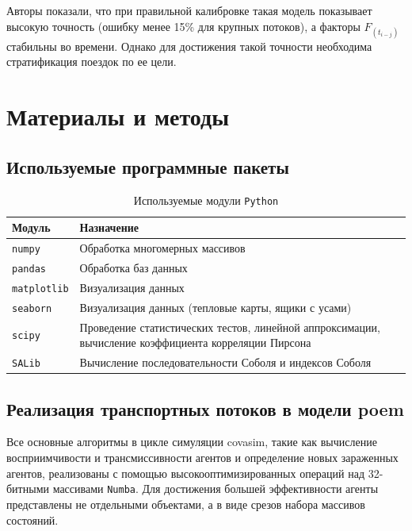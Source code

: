 \documentclass[a4paper,12pt]{article} %
\begin{document}
Авторы показали, что при правильной калибровке такая модель показывает высокую точность (ошибку менее 15\% для крупных потоков), а факторы $F_{(t_{i-j})}$ стабильны во времени. Однако для достижения такой точности необходима стратификация поездок по ее цели.



\section{Материалы и методы}
\subsection{Используемые программные пакеты}
\begin{table}[h!]
\centering
\begin{tabular}{p{4cm} p{10cm}}
\toprule
\textbf{Модуль} & \textbf{Назначение} \\
\midrule
\texttt{numpy} \cite{harris2020array} & Обработка многомерных массивов \\
\texttt{pandas} \cite{reback2020pandas} & Обработка баз данных \\
\texttt{matplotlib} \cite{Hunter:2007} & Визуализация данных \\
\texttt{seaborn} \cite{michael_waskom_2017_883859} & Визуализация данных (тепловые карты, ящики с усами) \\
\texttt{scipy} \cite{2020SciPy-NMeth} & Проведение статистических тестов, линейной аппроксимации, вычисление коэффициента корреляции Пирсона \\
\texttt{SALib} \cite{Iwanaga2022, Herman2017} & Вычисление последовательности Соболя и индексов Соболя \\
\bottomrule
\end{tabular}
\caption{Используемые модули \texttt{Python}}
\end{table}
\subsection{Реализация транспортных потоков в модели \gls{poem}}

Все основные алгоритмы в цикле симуляции \gls{covasim}, такие как вычисление восприимчивости и трансмиссивности агентов и определение новых зараженных агентов, реализованы с помощью высокооптимизированных операций над 32-битными массивами \texttt{Numba}. Для достижения большей эффективности агенты представлены не отдельными объектами, а в виде срезов набора массивов состояний.
\end{document}
